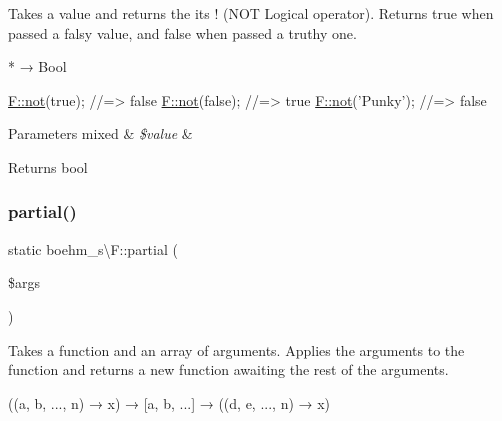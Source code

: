 Takes a value and returns the it\textquotesingle{}s {\ttfamily !} (N\+OT Logical operator). Returns true when passed a falsy value, and false when passed a truthy one.


\begin{DoxyCode}
* → Bool 
\end{DoxyCode}
 
\begin{DoxyCodeInclude}
\hyperlink{classboehm__s_1_1F_a0cf3df6448dbfa748f755494974d13ab}{F::not}(\textcolor{keyword}{true}); \textcolor{comment}{//=> false}
\hyperlink{classboehm__s_1_1F_a0cf3df6448dbfa748f755494974d13ab}{F::not}(\textcolor{keyword}{false}); \textcolor{comment}{//=> true}
\hyperlink{classboehm__s_1_1F_a0cf3df6448dbfa748f755494974d13ab}{F::not}(\textcolor{stringliteral}{'Punky'}); \textcolor{comment}{//=> false}
\end{DoxyCodeInclude}
 
\begin{DoxyParams}[1]{Parameters}
mixed & {\em \$value} & \\
\hline
\end{DoxyParams}
\begin{DoxyReturn}{Returns}
bool 
\end{DoxyReturn}
\mbox{\label{classboehm__s_1_1F_ab29a37d2aca75028895148da5da15b4b}} 
\subsubsection{\texorpdfstring{partial()}{partial()}}
{\footnotesize\ttfamily static boehm\+\_\+s\textbackslash{}\+F\+::partial (\begin{DoxyParamCaption}\item[{}]{\$args }\end{DoxyParamCaption})\hspace{0.3cm}{\ttfamily [static]}}

Takes a function and an array of arguments. Applies the arguments to the function and returns a new function awaiting the rest of the arguments.


\begin{DoxyCode}
((a, b, ..., n) → x) → [a, b, ...] → ((d, e, ..., n) → x) 
\end{DoxyCode}
 
 
